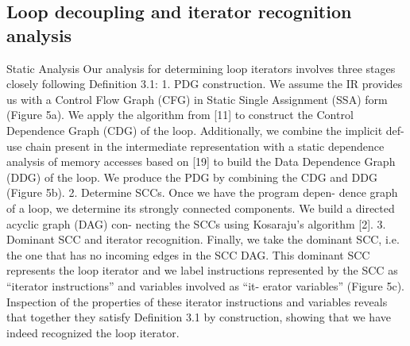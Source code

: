 \subsection{Loop decoupling and iterator recognition analysis}
Static Analysis
Our analysis for determining loop iterators involves three
stages closely following Definition 3.1:
1. PDG construction. We assume the IR provides us with
a Control Flow Graph (CFG) in Static Single Assignment
(SSA) form (Figure 5a). We apply the algorithm from [11] to
construct the Control Dependence Graph (CDG) of the loop.
Additionally, we combine the implicit def-use chain present
in the intermediate representation with a static dependence
analysis of memory accesses based on [19] to build the Data
Dependence Graph (DDG) of the loop. We produce the PDG
by combining the CDG and DDG (Figure 5b).
2. Determine SCCs. Once we have the program depen-
dence graph of a loop, we determine its strongly connected
components. We build a directed acyclic graph (DAG) con-
necting the SCCs using Kosaraju’s algorithm [2].
3. Dominant SCC and iterator recognition. Finally, we
take the dominant SCC, i.e. the one that has no incoming
edges in the SCC DAG. This dominant SCC represents the
loop iterator and we label instructions represented by the
SCC as “iterator instructions” and variables involved as “it-
erator variables” (Figure 5c). Inspection of the properties of
these iterator instructions and variables reveals that together
they satisfy Definition 3.1 by construction, showing that we
have indeed recognized the loop iterator.


